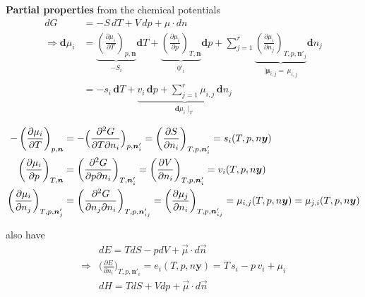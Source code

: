 \begin{thm}
    \textbf{Partial properties} from the chemical potentials
    \begin{align*}
        dG &= -S \, dT + V \, dp + \mu \cdot dn\\
\Rightarrow
    \mathbf{d}\mu_i &= \underbrace{\left(\frac{\partial\mu_i}
    {\partial T}\right)_{p,\boldsymbol{n}}}_{\substack{-S_i}} \mathbf{d}T 
    + \underbrace{\left(\frac{\partial\mu_i}{\partial p}\right)_{T,\boldsymbol{n}}}_{\substack{0'_i}} 
    \mathbf{d}p + \sum_{j=1}^r \underbrace{\left(\frac{\partial\mu_i}{\partial n_j}\right)_
    {T,p,\boldsymbol{n}'_j}}_{\substack{\lvert \boldsymbol{\mu}_{i,j} =\, \mu_{i,j}}} \mathbf{d}n_j 
    \\&= -s_i \, \mathbf{d}T + \underbrace{v_i \, \mathbf{d}p + \sum_{j=1}^r \mu_{i,j} \, \mathbf{d}n_j}_{\mathbf{d}\mu_i \mid_T}
    \end{align*}
    \begin{zhu}
        \begin{align*}
            -\left(\frac{\partial \mu_i}{\partial T}\right)_{p,\boldsymbol{n}} 
            &= -\Bigl(\frac{\partial^2 G}{\partial T \partial n_i}\Bigr)_{p,\boldsymbol{n}'_i} 
            = \left(\frac{\partial S}{\partial n_i}\right)_{T,p,\boldsymbol{n}'_i} 
            = s_i(T,p,n\boldsymbol{y})  \\
            \left(\frac{\partial \mu_i}{\partial p}\right)_{T,\boldsymbol{n}} 
            &= \left(\frac{\partial^2 G}{\partial p \partial n_i}\right)_{T,\boldsymbol{n}'_i} 
            = \left(\frac{\partial V}{\partial n_i}\right)_{T,p,\boldsymbol{n}'_i} 
            = v_i(T,p,n\boldsymbol{y})  \\
            \left(\frac{\partial \mu_i}{\partial n_j}\right)_{T,p,\boldsymbol{n}'_j} 
            &= \left(\frac{\partial^2 G}{\partial n_j \partial n_i}\right)_{T,p,\boldsymbol{n}'_{ij}} 
            = \left(\frac{\partial \mu_j}{\partial n_i}\right)_{T,p,\boldsymbol{n}'_{ij}} 
            = \mu_{i,j}(T,p,n\boldsymbol{y}) = \mu_{j,i}(T,p,n\boldsymbol{y})
        \end{align*}
    \end{zhu}
    also have
    \begin{align*}
        &dE =TdS -pdV +\vec{\mu}\cdot d\vec{n}\\
        \Rightarrow&\Big(\frac{\partial E}{\partial n_i}\Big)_{T,p,\boldsymbol{n}'_i} = e_i(T,p,n\boldsymbol{y}) 
        = T \, s_i - p \, v_i + \mu_i  \\
        &dH =TdS +Vdp +\vec{\mu}\cdot d\vec{n}\\

\end{align*}
\end{thm}
